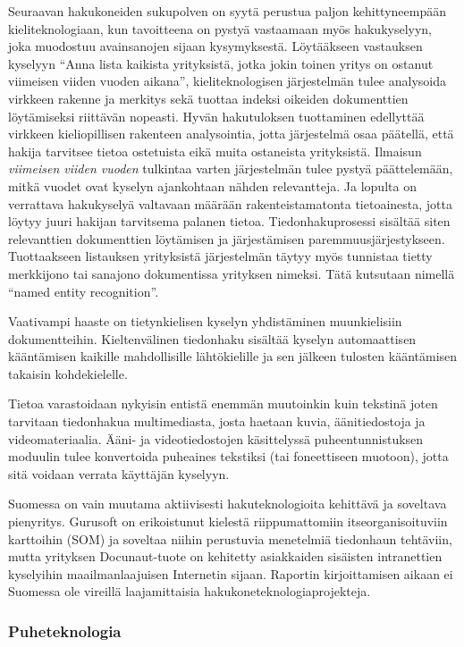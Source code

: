 \documentclass[]{../../metanetpaper}
\begin{document}
\begin{multicols}{2}
Seuraavan hakukoneiden sukupolven on syytä perustua paljon
kehittyneempään kieliteknologiaan, kun tavoitteena on
pystyä vastaamaan myös hakukyselyyn, joka muodostuu
avainsanojen sijaan kysymyksestä. Löytääkseen vastauksen kyselyyn “Anna lista 
kaikista yrityksistä, jotka jokin toinen yritys on ostanut viimeisen viiden vuoden aikana”,
kieliteknologisen järjestelmän tulee analysoida virkkeen rakenne ja merkitys 
sekä tuottaa indeksi oikeiden dokumenttien löytämiseksi riittävän nopeasti. 
Hyvän hakutuloksen tuottaminen edellyttää virkkeen kieliopillisen rakenteen
analysointia, jotta järjestelmä osaa päätellä, että hakija tarvitsee
tietoa ostetuista eikä muita ostaneista yrityksistä. Ilmaisun
\textit{viimeisen viiden vuoden} tulkintaa varten järjestelmän tulee
pystyä päättelemään, mitkä vuodet ovat kyselyn ajankohtaan nähden
relevantteja. Ja lopulta on verrattava hakukyselyä valtavaan määrään
rakenteistamatonta tietoainesta, jotta löytyy juuri hakijan tarvitsema palanen 
tietoa. Tiedonhakuprosessi sisältää siten relevanttien dokumenttien löytämisen ja 
järjestämisen paremmuusjärjestykseen. Tuottaakseen listauksen yrityksistä 
järjestelmän täytyy myös tunnistaa tietty merkkijono tai sana\-jono dokumentissa yrityksen
nimeksi. Tätä kutsutaan nimellä “named entity
recognition”.

Vaativampi haaste on tietynkielisen kyselyn yhdistäminen muunkielisiin
dokumentteihin. Kieltenvälinen tiedonhaku sisältää kyselyn
automaattisen kääntämisen kaikille mahdollisille lähtökielille ja sen
jälkeen tulosten kääntämisen takaisin kohdekielelle.

Tietoa varastoidaan nykyisin entistä enemmän muutoinkin kuin
tekstinä joten tarvitaan tiedonhakua multimediasta, josta haetaan kuvia, 
äänitiedostoja ja videomateriaalia. Ääni- ja videotiedostojen käsittelyssä 
puheentunnistuksen moduulin tulee konvertoida puheaines tekstiksi 
(tai foneettiseen muotoon), jotta sitä voidaan verrata käyttäjän kyselyyn.

Suomessa on vain muutama aktiivisesti hakuteknologioita kehittävä ja soveltava 
pienyritys. Gurusoft on erikoistunut kielestä riippumattomiin itseorganisoituviin 
karttoihin (SOM) ja soveltaa niihin perustuvia menetelmiä tiedonhaun tehtäviin, 
mutta yrityksen Docunaut-tuote on kehitetty asiakkaiden sisäisten intranettien kyselyihin
maailmanlaajuisen Internetin sijaan. Raportin kirjoittamisen aikaan ei
Suomessa ole vireillä laajamittaisia hakukoneteknologiaprojekteja.



\subsubsection{Puheteknologia}



\end{multicols}
\end{document}
